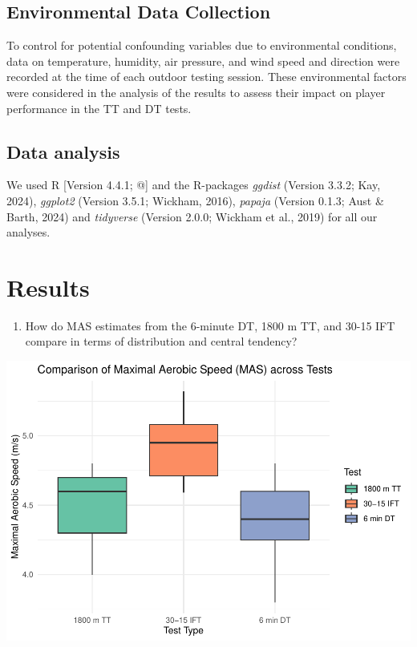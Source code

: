 \documentclass[
  man]{apa6}
\providecommand{\tightlist}{%
  \setlength{\itemsep}{0pt}\setlength{\parskip}{0pt}}
\begin{document}
\subsection{Environmental Data Collection}\label{environmental-data-collection}

To control for potential confounding variables due to environmental conditions, data on temperature, humidity, air pressure, and wind speed and direction were recorded at the time of each outdoor testing session. These environmental factors were considered in the analysis of the results to assess their impact on player performance in the TT and DT tests.

\subsection{Data analysis}\label{data-analysis}

We used R {[}Version 4.4.1; @{]} and the R-packages \emph{ggdist} (Version 3.3.2; Kay, 2024), \emph{ggplot2} (Version 3.5.1; Wickham, 2016), \emph{papaja} (Version 0.1.3; Aust \& Barth, 2024) and \emph{tidyverse} (Version 2.0.0; Wickham et al., 2019) for all our analyses.

\clearpage

\section{Results}\label{results}

\begin{enumerate}
\def\labelenumi{\arabic{enumi}.}
\tightlist
\item
  How do MAS estimates from the 6-minute DT, 1800 m TT, and 30-15 IFT compare in terms of distribution and central tendency?
\end{enumerate}

\includegraphics{FinalProject_files/figure-latex/plot 1-1.pdf}
\clearpage
\end{document}

